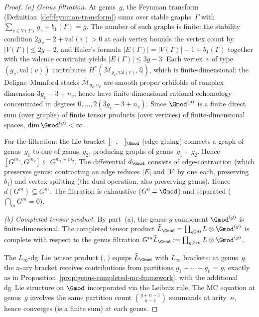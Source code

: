 \begin{proof}
\emph{(a) Genus filtration.}
At genus~$g$, the Feynman transform
(Definition~\ref{def:feynman-transform}) sums over stable
graphs~$\Gamma$ with $\sum_{v \in V(\Gamma)} g_v + b_1(\Gamma) = g$.
The number of such graphs is finite: the stability condition
$2g_v - 2 + \mathrm{val}(v) > 0$ at each vertex bounds the
vertex count by $|V(\Gamma)| \leq 2g-2$, and Euler's formula
$|E(\Gamma)| = |V(\Gamma)| - 1 + b_1(\Gamma)$ together with
the valence constraint yields $|E(\Gamma)| \leq 3g-3$.
Each vertex~$v$ of type $(g_v, \mathrm{val}(v))$ contributes
$H^*(\overline{\mathcal{M}}_{g_v, \mathrm{val}(v)}, \mathbb{Q})$,
which is finite-dimensional: the Deligne--Mumford stacks
$\overline{\mathcal{M}}_{g_v,n_v}$ are smooth proper orbifolds of
complex dimension $3g_v - 3 + n_v$, hence have finite-dimensional
rational cohomology concentrated in degrees
$0, \ldots, 2(3g_v - 3 + n_v)$.
Since ${\Gmod}^{(g)}$ is a finite direct sum (over graphs) of
finite tensor products (over vertices) of finite-dimensional
spaces, $\dim {\Gmod}^{(g)} < \infty$.

For the filtration: the Lie bracket $[-,-]_{\Gmod}$ (edge-gluing)
connects a graph of genus~$g_1$ to one of genus~$g_2$, producing
graphs of genus~$g_1 + g_2$.  Hence
$[G^{m_1}, G^{m_2}] \subseteq G^{m_1+m_2}$.
The differential $d_{\Gmod}$ consists of edge-contraction
(which preserves genus: contracting an edge reduces $|E|$ and
$|V|$ by one each, preserving $b_1$) and vertex-splitting (the
dual operation, also preserving genus).  Hence $d(G^m) \subseteq G^m$.
The filtration is exhaustive ($G^0 = \Gmod$) and separated
($\bigcap_m G^m = 0$).

\emph{(b) Completed tensor product.}
By part~(a), the genus-$g$ component ${\Gmod}^{(g)}$ is
finite-dimensional.  The completed tensor product
$\widehat{L}_{\Gmod} = \prod_{g \geq 0} L \otimes {\Gmod}^{(g)}$
is complete with respect to the genus filtration
$G^m \widehat{L}_{\Gmod} := \prod_{g \geq m} L \otimes {\Gmod}^{(g)}$.

The $L_\infty$-dg~Lie tensor product
(\cite[§12.3]{Fresse-operads}, \cite[§10.3]{LV12})
equips $\widehat{L}_{\Gmod}$ with $L_\infty$ brackets:
at genus~$g$, the $n$-ary bracket receives contributions from
partitions $g_1 + \cdots + g_n = g$, exactly as in
Proposition~\ref{prop:genus-completed-mc-framework}, with the
additional dg~Lie structure on $\Gmod$ incorporated via the
Leibniz rule.  The MC equation at genus~$g$ involves the same
partition count $\binom{g+n-1}{n-1}$ summands at arity~$n$,
hence converges (is a finite sum) at each genus.


\end{proof}

